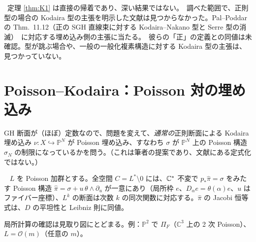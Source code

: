 \begin{rem}[位置づけ]
\tP\ 定理 \ref{thm:K1} は直接の帰着であり、深い結果ではない。\tC\ 調べた範囲で、正則型の場合の Kodaira 型の主張を明示した文献は見つからなかった。Pal--Poddar の Thm.\ 11.12（正の SGH 直線束に対する Kodaira--Nakano 型と Serre 型の消滅）\tC\ に対応する埋め込み側の主張に当たる。\tQ\ 彼らの「正」の定義との同値は未確認。型が跳ぶ場合や、一般の一般化複素構造に対する Kodaira 型の主張は、見つかっていない。
\end{rem}

\section{Poisson--Kodaira：Poisson 対の埋め込み}\label{sec:PK}
GH 断面が（ほぼ）定数なので、問題を変えて、\emph{通常の}正則断面による Kodaira 埋め込み $\nu:X\hookrightarrow\mathbb P^N$ が Poisson 埋め込み、すなわち $\sigma$ が $\mathbb P^N$ 上の Poisson 構造 $\sigma_N$ の制限になっているかを問う。（これは筆者の提案であり、文献にある定式化ではない。）

\begin{lem}\tP\ \tQ\label{lem:lift}
$L$ を Poisson 加群とする。全空間 $C=L^*\setminus 0$ には、$\mathbb C^*$ 不変で $p_*\hat\pi=\sigma$ をみたす Poisson 構造 $\hat\pi=\sigma+u\,\theta\wedge\partial_u$ が一意にあり（局所枠 $e$、$D_\alpha e=\theta(\alpha)e$、$u$ はファイバー座標）、$L^k$ の断面は次数 $k$ の同次関数に対応する。$\hat\pi$ の Jacobi 恒等式は、$D$ の平坦性と Leibniz 則に同値。
\end{lem}
\noindent 局所計算の確認は見取り図にとどまる\tQ。例：$\mathbb P^2$ で $\Pi_F$（$\mathbb C^3$ 上の 2 次 Poisson）、$L=\mathcal O(m)$（任意の $m$）。

